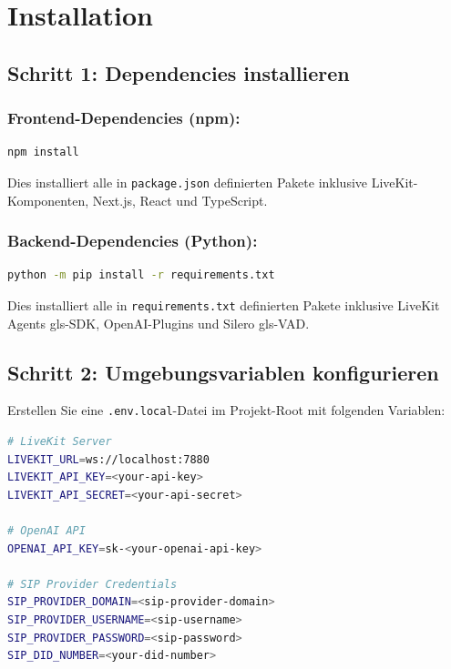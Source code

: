 \section{Installation}
\label{sec:anhang-installation}

\subsection{Schritt 1: Dependencies installieren}

\subsubsection{Frontend-Dependencies (npm):}

\begin{lstlisting}[language=bash,caption={Node.js-Pakete installieren}]
npm install
\end{lstlisting}

\noindent Dies installiert alle in \texttt{package.json} definierten Pakete inklusive LiveKit-Komponenten, Next.js, React und TypeScript.

\subsubsection{Backend-Dependencies (Python):}

\begin{lstlisting}[language=bash,caption={Python-Pakete installieren}]
python -m pip install -r requirements.txt
\end{lstlisting}

\noindent Dies installiert alle in \texttt{requirements.txt} definierten Pakete inklusive LiveKit Agents \gls{gls-SDK}, OpenAI-Plugins und Silero \gls{gls-VAD}.

\subsection{Schritt 2: Umgebungsvariablen konfigurieren}

Erstellen Sie eine \texttt{.env.local}-Datei im Projekt-Root mit folgenden Variablen:

\begin{lstlisting}[language=bash,caption={Umgebungsvariablen (.env.local)}]
# LiveKit Server
LIVEKIT_URL=ws://localhost:7880
LIVEKIT_API_KEY=<your-api-key>
LIVEKIT_API_SECRET=<your-api-secret>

# OpenAI API
OPENAI_API_KEY=sk-<your-openai-api-key>

# SIP Provider Credentials
SIP_PROVIDER_DOMAIN=<sip-provider-domain>
SIP_PROVIDER_USERNAME=<sip-username>
SIP_PROVIDER_PASSWORD=<sip-password>
SIP_DID_NUMBER=<your-did-number>
\end{lstlisting}

